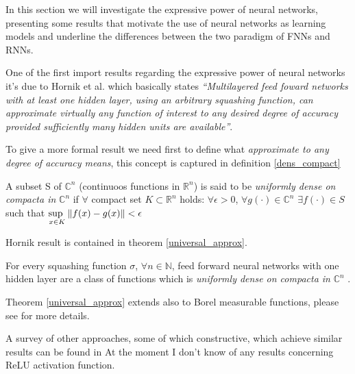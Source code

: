 In this section we will investigate the expressive power of neural networks, presenting some results that motivate the use of neural networks as learning
models and underline the differences between the two paradigm of FNNs and RNNs. 

One of the first import results regarding the expressive power of neural networks it's due to Hornik et al. \cite{Hornik89} which basically states
\textit{``Multilayered feed foward networks with at least one hidden layer, using an arbitrary squashing function, can approximate virtually any function
of interest to any desired degree of accuracy provided sufficiently many hidden units are available''}.

To give a more formal result we need first to define what \textit{approximate to any degree of accuracy means}, this concept is captured in definition
\ref{dens_compact}
 
\begin{defn}
 A subset S of $\mathbb{C}^n$ (continuoos functions in $\mathbb{R}^n$) is said to be \textit{uniformly dense on compacta in} $\mathbb{C}^n$ if $\forall$
 compact set $K\subset \mathbb{R}^n$ holds: $\forall \epsilon >0$, $\forall g(\cdot) \in \mathbb{C}^n$ $\exists f(\cdot) \in S$ such that 
 $\underset{x \in K}{\text{sup  }} \left\Vert f(x)-g(x) \right\Vert<\epsilon$ 
 \label{dens_compact}
\end{defn}

Hornik result is contained in theorem \ref{universal_approx}.
\begin{thm}
 For every squashing function $\sigma$, $\forall n\in \mathbb{N}$, feed forward neural
 networks with one hidden layer are a class of functions which is \textit{uniformly dense on compacta in} $\mathbb{C}^n$
\label{universal_approx}.
\end{thm}

Theorem \ref{universal_approx} extends also to Borel measurable functions, please see \cite{Hornik89} for more details.

A survey of other approaches, some of which constructive, which achieve similar results can be found in \cite{Scarselli98}
At the moment I don't know of any results concerning ReLU activation function.


